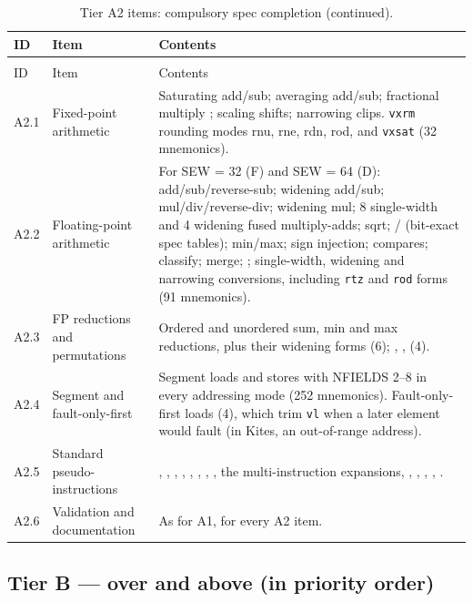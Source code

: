 \documentclass[11pt]{article}
\begin{document}
\small
\begin{longtable}{@{}L{1.0cm}L{3.4cm}L{10.7cm}@{}}
\caption{Tier A2 items: compulsory spec completion.}\label{tab:tierA2}\\
\toprule
ID & Item & Contents \\
\midrule
\endfirsthead
\caption[]{Tier A2 items: compulsory spec completion (continued).}\\
\toprule
ID & Item & Contents \\
\midrule
\endhead
A2.1 & Fixed-point arithmetic & Saturating add/sub; averaging add/sub; fractional multiply ; scaling shifts; narrowing clips. \texttt{vxrm} rounding modes rnu, rne, rdn, rod, and \texttt{vxsat} (32 mnemonics). \\
A2.2 & Floating-point arithmetic & For SEW = 32 (F) and SEW = 64 (D): add/sub/reverse-sub; widening add/sub; mul/div/reverse-div; widening mul; 8 single-width and 4 widening fused multiply-adds; sqrt; / (bit-exact spec tables); min/max; sign injection; compares; classify; merge; ; single-width, widening and narrowing conversions, including \texttt{rtz} and \texttt{rod} forms (91 mnemonics). \\
A2.3 & FP reductions and permutations & Ordered and unordered sum, min and max reductions, plus their widening forms (6); , ,  (4). \\
A2.4 & Segment and fault-only-first & Segment loads and stores with NFIELDS 2--8 in every addressing mode (252 mnemonics). Fault-only-first loads  (4), which trim \texttt{vl} when a later element would fault (in Kites, an out-of-range address). \\
A2.5 & Standard pseudo-instructions & , , , , , , , , the multi-instruction  expansions, , , , , . \\
A2.6 & Validation and documentation & As for A1, for every A2 item. \\
\bottomrule
\end{longtable}
\normalsize

\subsection{Tier B --- over and above (in priority order)}
\end{document}
